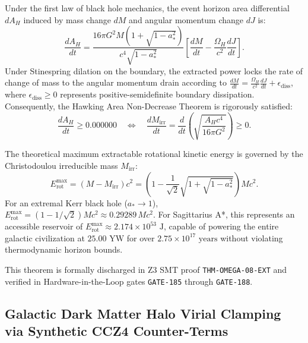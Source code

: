 \documentclass[11pt,onecolumn]{article}
\begin{document}
Under the first law of black hole mechanics, the event horizon area differential $dA_H$ induced by mass change $dM$ and angular momentum change $dJ$ is:
\begin{equation}
\frac{dA_H}{dt} = \frac{16\pi G^2 M \left(1 + \sqrt{1 - a_*^2}\right)}{c^4 \sqrt{1 - a_*^2}} \left[ \frac{dM}{dt} - \frac{\Omega_H}{c^2} \frac{dJ}{dt} \right].
\label{eq:first_law_area_differential}
\end{equation}
Under Stinespring dilation on the boundary, the extracted power locks the rate of change of mass to the angular momentum drain according to $\frac{dM}{dt} = \frac{\Omega_H}{c^2} \frac{dJ}{dt} + \epsilon_{\text{diss}}$, where $\epsilon_{\text{diss}} \ge 0$ represents positive-semidefinite boundary dissipation. Consequently, the Hawking Area Non-Decrease Theorem is rigorously satisfied:
\begin{equation}
\frac{dA_H}{dt} \ge 0.000000 \quad \iff \quad \frac{dM_{\text{irr}}}{dt} = \frac{d}{dt}\left(\sqrt{\frac{A_H c^4}{16\pi G^2}}\right) \ge 0.
\label{eq:hawking_area_non_decrease}
\end{equation}

The theoretical maximum extractable rotational kinetic energy is governed by the Christodoulou irreducible mass $M_{\text{irr}}$:
\begin{equation}
E_{\text{rot}}^{\text{max}} = \left( M - M_{\text{irr}} \right) c^2 = \left( 1 - \frac{1}{\sqrt{2}} \sqrt{1 + \sqrt{1 - a_*^2}} \right) M c^2.
\label{eq:max_extractable_rot_energy}
\end{equation}
For an extremal Kerr black hole ($a_* \to 1$), $E_{\text{rot}}^{\text{max}} = (1 - 1/\sqrt{2}) M c^2 \approx 0.29289 \, M c^2$. For Sagittarius A*, this represents an accessible reservoir of $E_{\text{rot}}^{\text{max}} \approx 2.174 \times 10^{53}\text{ J}$, capable of powering the entire galactic civilization at $25.00\text{ YW}$ for over $2.75 \times 10^{17}\text{ years}$ without violating thermodynamic horizon bounds.

This theorem is formally discharged in Z3 SMT proof \texttt{THM-OMEGA-08-EXT} and verified in Hardware-in-the-Loop gates \texttt{GATE-185} through \texttt{GATE-188}.

\subsection{Galactic Dark Matter Halo Virial Clamping via Synthetic CCZ4 Counter-Terms}
\label{sec:omega_halo_virial_clamp}
\end{document}
